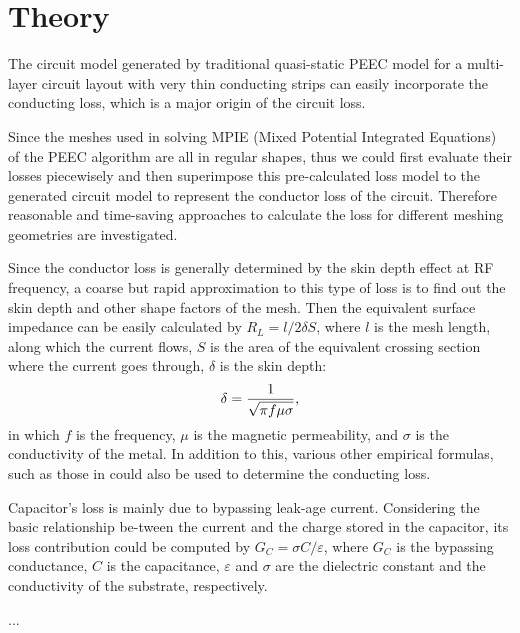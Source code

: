 \documentclass[twocolumn]{article}
\begin{document}
\section{Theory}
The circuit model generated by traditional quasi-static PEEC model
for a multi-layer circuit layout with very thin conducting strips
can easily incorporate the conducting loss, which is a major origin
of the circuit loss.

Since the meshes used in solving MPIE (Mixed Potential Integrated
Equations) of the PEEC algorithm are all in regular shapes, thus we
could first evaluate their losses piecewisely and then superimpose
this pre-calculated loss model to the generated circuit model to
represent the conductor loss of the circuit. Therefore reasonable
and time-saving approaches to calculate the loss for different
meshing geometries are investigated.

Since the conductor loss is generally determined by the skin depth
effect at RF frequency, a coarse but rapid approximation to this
type of loss is to find out the skin depth and other shape factors
of the mesh. Then the equivalent surface impedance can be easily
calculated by $R_{L} = l / 2\delta S$, where $l$ is the mesh length,
along which the current flows, $S$ is the area of the equivalent
crossing section where the current goes through, $\delta$ is the
skin depth:
\begin{align}
 \delta=\frac{1}{\sqrt{\smash[b]{\pi f \mu \sigma}}},
 \label{Equ1}
 \end{align}
in which $f$ is the frequency, $\mu$ is the magnetic permeability,
and $\sigma$ is the conductivity of the metal. In addition to this,
various other empirical formulas, such as those in
could also be used to
determine the conducting loss.

Capacitor's loss is mainly due to bypassing leak-age current.
Considering the basic relationship be-tween the current and the
charge stored in the capacitor, its loss
contribution could be computed by $G_{C} = \sigma C / \varepsilon$,
where $G_{C}$ is the bypassing conductance, $C$ is the capacitance,
$\varepsilon$ and $\sigma$ are the dielectric constant and the
conductivity of the substrate, respectively.

...
\end{document}
